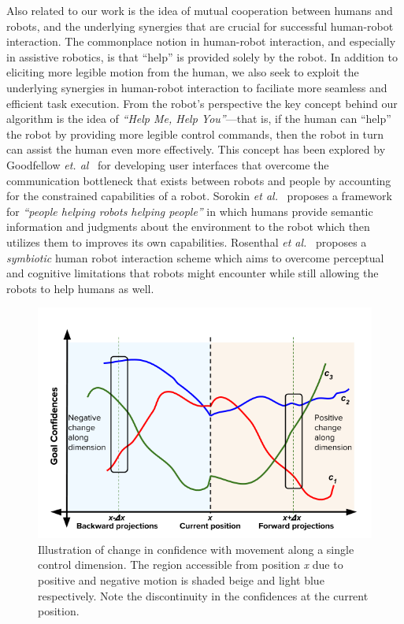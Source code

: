 \documentclass[conference]{IEEEtran}
\begin{document}
Also related to our work is the idea of mutual cooperation between humans and robots, and the underlying synergies that are crucial for successful human-robot interaction. The commonplace notion in human-robot interaction, and especially in assistive robotics, is that ``help'' is provided solely by the robot. In addition to eliciting more legible motion from the human, we also seek to exploit the underlying synergies in human-robot interaction to faciliate more seamless and efficient task execution. From the robot's perspective the key concept behind our algorithm is the idea of \textit{``Help Me, Help You''}---that is, if the human can ``help'' the robot by providing more legible control commands, then the robot in turn can assist the human even more effectively. This concept has been explored by Goodfellow \textit{et. al}~\cite{goodfellow2010help} for developing user interfaces that overcome the communication bottleneck that exists between robots and people by accounting for the constrained capabilities of a robot. Sorokin \textit{et al.}~\cite{sorokin2010people} proposes a framework for \textit{``people helping robots helping people''} in which humans provide semantic information and judgments about the environment to the robot which then utilizes them to improves its own capabilities.  Rosenthal \textit{et al.}~\cite{rosenthal2010effective} proposes a \textit{symbiotic} human robot interaction scheme which aims to overcome perceptual and cognitive limitations that robots might encounter while still allowing the robots to help humans as well. 

\begin{figure}
	\includegraphics[width = 1\hsize, height = 0.26\vsize]{./figures/DisambMetric.png}
	\vspace{-0.4cm}
	\caption{Illustration of change in confidence with movement along a single control dimension. The region accessible from position \textit{x} due to positive and negative motion is shaded beige and light blue respectively. Note the discontinuity in the confidences at the current position.}
	\label{DM_FIG}
\end{figure}
\end{document}
